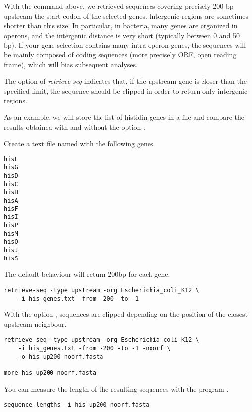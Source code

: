 With the command above, we retrieved sequences covering precisely 200
bp upstream the start codon of the selected genes. Intergenic regions
are sometimes shorter than this size. In particular, in bacteria, many
genes are organized in operons, and the intergenic distance is very
short (typically between 0 and 50 bp). If your gene selection contains
many intra-operon genes, the sequences will be mainly composed of
coding sequences (more precisely ORF, open reading frame), which will
bias subsequent analyses.

The option  of \textit{retrieve-seq} indicates that, if
the upstream gene is closer than the specified limit, the sequence
should be clipped in order to return only intergenic regions.

As an example, we will store the list of histidin genes in a file and
compare the results obtained with and without the option
.

Create a text file named  with the following
genes.

\begin{footnotesize}
\begin{verbatim}
hisL
hisG
hisD
hisC
hisH
hisA
hisF
hisI
hisP
hisM
hisQ
hisJ
hisS
\end{verbatim}
\end{footnotesize}

The default behaviour will return 200bp for each gene. 

\begin{lstlisting}
retrieve-seq -type upstream -org Escherichia_coli_K12 \
    -i his_genes.txt -from -200 -to -1
\end{lstlisting}

With the option , sequences are clipped depending on
the position of the closest upstream neighbour.

\begin{lstlisting}
retrieve-seq -type upstream -org Escherichia_coli_K12 \
    -i his_genes.txt -from -200 -to -1 -noorf \
    -o his_up200_noorf.fasta

more his_up200_noorf.fasta
\end{lstlisting}

You can measure the length of the resulting sequences with the program
.

\begin{lstlisting}
sequence-lengths -i his_up200_noorf.fasta
\end{lstlisting}

